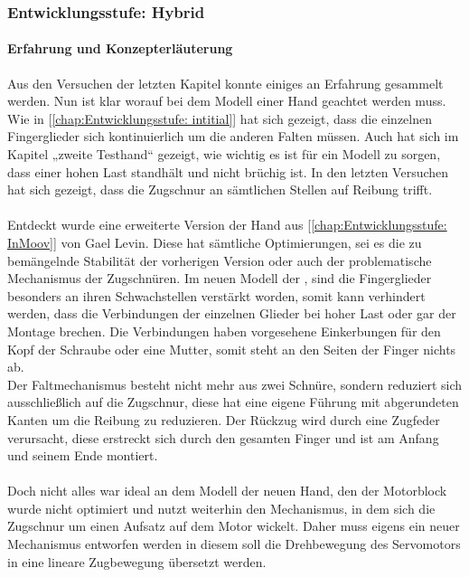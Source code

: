 \documentclass[titlepage,12pt,twoside]{article}
\begin{document}
\subsubsection{Entwicklungsstufe: Hybrid}
\label{chap:Entwicklungsstufe: Hybrid}
\paragraph{Erfahrung und Konzepterläuterung}
\hfill \break
\hfill \break
Aus den Versuchen der letzten Kapitel konnte einiges an Erfahrung gesammelt werden. Nun ist klar worauf bei dem Modell einer Hand geachtet werden muss. \\
Wie in [\textcolor{blue}{\autoref{chap:Entwicklungsstufe: intitial}}] hat sich gezeigt, dass die einzelnen Fingerglieder sich kontinuierlich um die anderen Falten müssen. Auch hat sich im Kapitel „zweite Testhand“ gezeigt, wie wichtig es ist für ein Modell zu sorgen, dass einer hohen 
Last standhält und nicht brüchig ist. In den letzten Versuchen hat sich gezeigt, dass die Zugschnur an sämtlichen Stellen auf Reibung trifft. \\
\\
Entdeckt wurde eine erweiterte Version der Hand aus [\textcolor{blue}{\autoref{chap:Entwicklungsstufe: InMoov}}] von Gael Levin. Diese hat sämtliche Optimierungen, sei es die zu bemängelnde Stabilität der vorherigen Version oder auch der problematische Mechanismus der 
Zugschnüren. Im neuen Modell der , sind die Fingerglieder besonders an ihren Schwachstellen verstärkt worden, somit kann verhindert werden, dass die Verbindungen der einzelnen Glieder bei hoher Last oder gar der Montage brechen. Die 
Verbindungen haben vorgesehene Einkerbungen für den Kopf der Schraube oder eine Mutter, somit steht an den Seiten der Finger nichts ab. \\
Der Faltmechanismus besteht nicht mehr aus zwei Schnüre, sondern reduziert sich ausschließlich auf die Zugschnur, diese hat eine eigene Führung mit abgerundeten Kanten um die Reibung zu reduzieren. Der Rückzug wird durch eine Zugfeder verursacht, 
diese erstreckt sich durch den gesamten Finger und ist am Anfang und seinem Ende montiert. \\
\\
Doch nicht alles war ideal an dem Modell der neuen Hand, den der Motorblock wurde nicht optimiert und nutzt weiterhin den Mechanismus, in dem sich die Zugschnur um einen Aufsatz auf dem Motor wickelt. Daher muss eigens ein neuer Mechanismus 
entworfen werden in diesem soll die Drehbewegung des Servomotors in eine lineare Zugbewegung übersetzt werden. \\
\\
\end{document}
